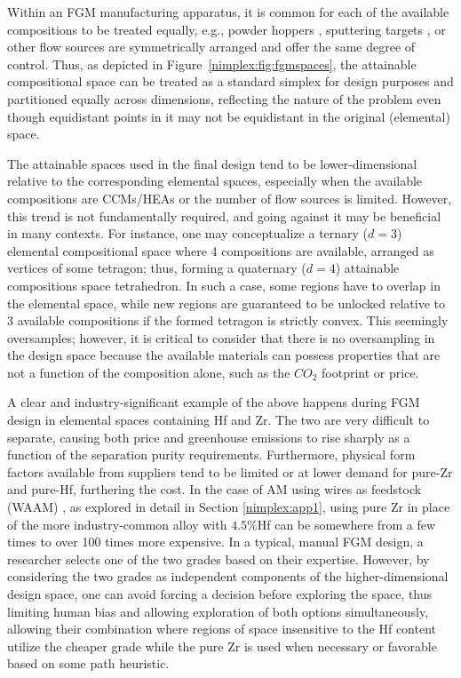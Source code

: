 Within an FGM manufacturing apparatus, it is common for each of the available compositions to be treated equally, e.g., powder hoppers \cite{Reichardt2021AdvancesMaterials}, sputtering targets \cite{Wu2023ATechnology}, or other flow sources are symmetrically arranged and offer the same degree of control. Thus, as depicted in Figure~\ref{nimplex:fig:fgmspaces}, the attainable compositional space can be treated as a standard simplex for design purposes and partitioned equally across dimensions, reflecting the nature of the problem even though equidistant points in it may not be equidistant in the original (elemental) space.

The attainable spaces used in the final design tend to be lower-dimensional relative to the corresponding elemental spaces, especially when the available compositions are CCMs/HEAs or the number of flow sources is limited. However, this trend is not fundamentally required, and going against it may be beneficial in many contexts. For instance, one may conceptualize a ternary ($d=3$) elemental compositional space where 4 compositions are available, arranged as vertices of some tetragon; thus, forming a quaternary ($d=4$) attainable compositions space tetrahedron. In such a case, some regions have to overlap in the elemental space, while new regions are guaranteed to be unlocked relative to 3 available compositions if the formed tetragon is strictly convex. This seemingly oversamples; however, it is critical to consider that there is no oversampling in the design space because the available materials can possess properties that are not a function of the composition alone, such as the $CO_2$ footprint or price. 

A clear and industry-significant example of the above happens during FGM design in elemental spaces containing Hf and Zr. The two are very difficult to separate, causing both price and greenhouse emissions to rise sharply as a function of the separation purity requirements. Furthermore, physical form factors available from suppliers tend to be limited or at lower demand for pure-Zr and pure-Hf, furthering the cost. In 
the case of AM using wires as feedstock (WAAM) \cite{Shen2016FabricationProcess}, as explored in detail in Section \ref{nimplex:app1}, using pure Zr in place of the more industry-common alloy with $4.5\%$Hf can be somewhere from a few times to over 100 times more expensive. In a typical, manual FGM design, a researcher selects one of the two grades based on their expertise. However, by considering the two grades as independent components of the higher-dimensional design space, one can avoid forcing a decision before exploring the space, thus limiting human bias and allowing exploration of both options simultaneously, allowing their combination where regions of space insensitive to the Hf content utilize the cheaper grade while the pure Zr is used when necessary or favorable based on some path heuristic.

